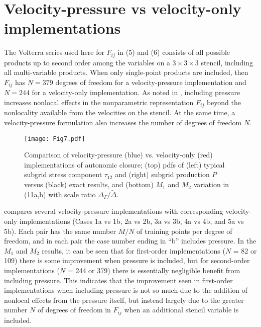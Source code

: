 \section{Velocity-pressure vs velocity-only implementations}
\label{sec:IVC}

The Volterra series used here for $F_{ij}$  in (5) and (6) consists of all possible products up to second order among the variables on a  $3 \times 3 \times 3$ stencil, including all multi-variable products. When only single-point products are included, then $F_{ij}$  has $N = 379$ degrees of freedom for a velocity-pressure implementation and $N = 244$ for a velocity-only implementation. As noted in , including pressure increases nonlocal effects in the nonparametric representation $F_{ij}$  beyond the nonlocality available from the velocities on the stencil. At the same time, a velocity-pressure formulation also increases the number of degrees of freedom $N$. 

%
\begin{figure}
	\begin{center}
	\texttt{[image: Fig7.pdf]}
	\caption{ Comparison of velocity-pressure (blue) vs. velocity-only (red) implementations of autonomic closure; (top) pdfs of (left) typical subgrid stress component $\tau_{12}$ and (right) subgrid production $P$ versus (black) exact results, and (bottom) $M_1$ and $M_2$ variation in (11a,b) with scale ratio $\Delta_{\Gamma}/\widetilde{\Delta}$. }
	\label{F:7}
	\end{center}
\end{figure}
%
%

  compares several velocity-pressure implementations with corresponding velocity-only implementations (Cases 1a vs 1b, 2a vs 2b, 3a vs 3b, 4a vs 4b, and 5a vs 5b). Each pair has the same number $M/N$  of training points per degree of freedom, and in each pair the case number ending in “b” includes pressure. In the $M_1$  and $M_2$  results, it can be seen that for first-order implementations ($N$ = 82 or 109) there is some improvement when pressure is included, but for second-order implementations ($N$ = 244 or 379) there is essentially negligible benefit from including pressure. This indicates that the improvement seen in first-order implementations when including pressure is not so much due to the addition of nonlocal effects from the pressure itself, but instead largely due to the greater number $N$ of degrees of freedom in $F_{ij}$  when an additional stencil variable is included. 


